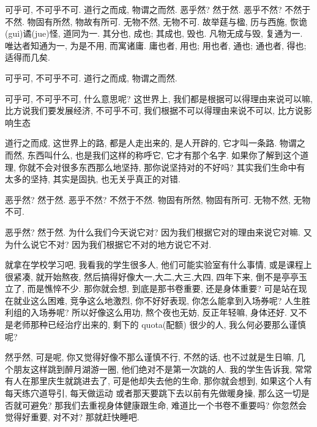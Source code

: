 \documentclass[11pt]{article}
\begin{document}
{\color{blue} 可乎可, 不可乎不可. 道行之而成, 物谓之而然. 恶乎然? 然于然. 恶乎不然? 不然于不然. 物固有所然, 物故有所可. 无物不然, 无物不可. 故举莛与楹, 历与西施, 恢诡(gui)谲(jue)怪, 道同为一. 其分也, 成也; 其成也, 毁也. 凡物无成与毁, 复通为一. 唯达者知通为一, 为是不用, 而寓诸庸. 庸也者, 用也; 用也者, 通也; 通也者, 得也; 适得而几矣.} 

\begin{center}
	{\color{green} 可乎可, 不可乎不可. 道行之而成, 物谓之而然.}
\end{center}

\vspace{-0.5cm}

{\color{blue} 可乎可, 不可乎不可,} 什么意思呢? 这世界上, 我们都是根据可以得理由来说可以嘛, 比方说我们要发展经济, {\color{blue} 不可乎不可}, 我们根据不可以得理由来说不可以, 比方说影响生态


{\color{blue} 道行之而成}, 这世界上的路, 都是人走出来的, 是人开辟的, 它才叫一条路. {\color{blue} 物谓之而然}, 东西叫什么, 也是我们这样的称呼它, 它才有那个名字. 如果你了解到这个道理, 你就不会对很多东西那么地坚持, 那你说坚持对的不好吗? 其实我们生命中有太多的坚持, 其实是固执, 也无关乎真正的对错. 

\newpage 

\begin{center}
	{\color{green} 恶乎然? 然于然. 恶乎不然? 不然于不然. 物固有所然, 物固有所可. 无物不然, 无物不可. }
\end{center}

\vspace{-0.5cm}

{\color{blue} 恶乎然? 然于然.} 为什么我们今天说它对? 因为我们根据它对的理由来说它对嘛. 又为什么说它不对? 因为我们根据它不对的地方说它不对.

就拿在学校学习吧, 我看我的学生很多人, 他们可能实验室有什么事情, 或是课程上很紧凑, 就开始熬夜, 然后搞得好像大一,大二,大三,大四, 四年下来, 倒不是亭亭玉立了, 而是憔悴不少. 那你就会想, 到底是那书卷重要, 还是身体重要? 可是站在现在就业这么困难, 竞争这么地激烈, 你不好好表现, 你怎么能拿到入场券呢? 人生胜利组的入场券呢? 所以好像这么用功, 熬个夜也无妨, 反正年轻嘛, 身体还好. 又不是老师那种已经治疗出来的, 剩下的 quota(配额) 很少的人, 我么何必要那么谨慎呢?

{\color{blue} 然乎然}, 可是呢, 你又觉得好像不那么谨慎不行, 不然的话, 也不过就是生日嘛, 几个朋友这样跳到醉月湖游一圈, 他们绝对不是第一次跳的人. 我的学生告诉我, 常常有人在那里庆生就跳进去了, 可是他却失去他的生命, 那你就会想到, 如果这个人有每天练穴道导引, 每天做运动 或者那天要跳下去以前有先做暖身操, 那么这一切是否就可避免? 那我们去重视身体健康跟生命, 难道比一个书卷不重要吗? 你忽然会觉得好重要, 对不对? 那就赶快睡吧. 
\end{document}
